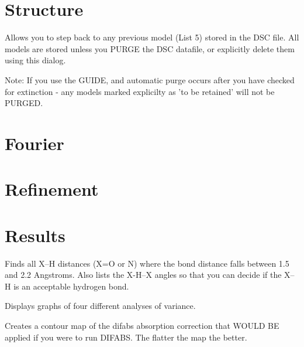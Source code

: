 \documentclass[10pt,a4paper]{report}
\begin{document}
\section{Structure}




\bigskip{}


\label{undo} 


Allows you to step back to any previous model (List 5) stored in the DSC
file. All models are stored unless you PURGE the DSC datafile, or
explicitly delete them using this dialog.


Note: If you use the GUIDE, and automatic purge occurs after you have
checked for extinction - any models marked explicilty as 'to be retained'
will not be PURGED.



\section{Fourier}


\section{Refinement}


\section{Results}




\bigskip{}




Finds all X--H distances (X=O or N) where the bond distance falls between
1.5 and 2.2 Angstroms. Also lists the X-H--X angles so that you can decide
if the X--H is an acceptable hydrogen bond.



\bigskip{}




Displays graphs of four different analyses of variance.





\bigskip{}




Creates a contour map of the difabs absorption correction that WOULD BE
applied if you were to run DIFABS. The flatter the map the better.
\end{document}
